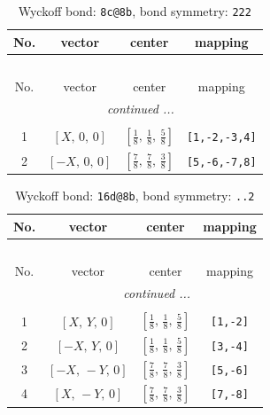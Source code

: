\documentclass[fleqn,8pt]{jsarticle}
\begin{document}
\begin{longtable}{cccc}
\caption{Wyckoff bond: {\tt 8c@8b}, bond symmetry: {\tt 222}}
 \\
 \hline \hline
No. & vector & center & mapping \\ \hline \endfirsthead

\multicolumn{3}{l}{\tablename\ \thetable{}} \\
 \hline \hline
No. & vector & center & mapping \\ \hline \endhead

 \hline \hline
\multicolumn{3}{r}{\footnotesize\it continued ...} \\ \endfoot

 \hline \hline
\multicolumn{3}{r}{} \\ \endlastfoot

1 & $\left[ X,\, 0,\, 0 \right]$ & $\left[ \frac{1}{8},\, \frac{1}{8},\, \frac{5}{8} \right]$ & {\tt [1,-2,-3,4]} \\ \hline
2 & $\left[ - X,\, 0,\, 0 \right]$ & $\left[ \frac{7}{8},\, \frac{7}{8},\, \frac{3}{8} \right]$ & {\tt [5,-6,-7,8]} \\
\end{longtable}
\renewcommand{\arraystretch}{1.2}
\begin{longtable}{cccc}
\caption{Wyckoff bond: {\tt 16d@8b}, bond symmetry: {\tt ..2}}
 \\
 \hline \hline
No. & vector & center & mapping \\ \hline \endfirsthead

\multicolumn{3}{l}{\tablename\ \thetable{}} \\
 \hline \hline
No. & vector & center & mapping \\ \hline \endhead

 \hline \hline
\multicolumn{3}{r}{\footnotesize\it continued ...} \\ \endfoot

 \hline \hline
\multicolumn{3}{r}{} \\ \endlastfoot

1 & $\left[ X,\, Y,\, 0 \right]$ & $\left[ \frac{1}{8},\, \frac{1}{8},\, \frac{5}{8} \right]$ & {\tt [1,-2]} \\ \hline
2 & $\left[ - X,\, Y,\, 0 \right]$ & $\left[ \frac{1}{8},\, \frac{1}{8},\, \frac{5}{8} \right]$ & {\tt [3,-4]} \\ \hline
3 & $\left[ - X,\, - Y,\, 0 \right]$ & $\left[ \frac{7}{8},\, \frac{7}{8},\, \frac{3}{8} \right]$ & {\tt [5,-6]} \\ \hline
4 & $\left[ X,\, - Y,\, 0 \right]$ & $\left[ \frac{7}{8},\, \frac{7}{8},\, \frac{3}{8} \right]$ & {\tt [7,-8]} \\
\end{longtable}
\end{document}
